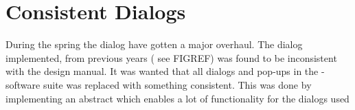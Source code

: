 \section{Consistent Dialogs}
\label{sec:consistent_dialogs}

During the spring the dialog have gotten a major overhaul. The dialog implemented, from previous years ( see FIGREF) was found to be inconsistent with the design manual. It was wanted that all dialogs and pop-ups in the \giraf-software suite was replaced with something consistent. This was done by implementing an abstract  which enables a lot of functionality for the dialogs used